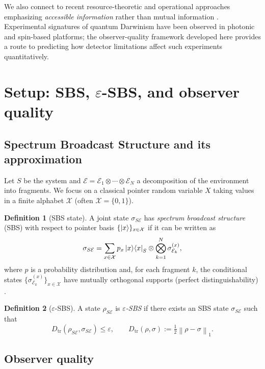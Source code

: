 \documentclass[11pt]{article}
\newcommand{\cE}{\mathcal{E}}
\newcommand{\cX}{\mathcal{X}}
\newcommand{\Dtr}{D_{\mathrm{tr}}}
\newcommand{\normone}[1]{\left\lVert #1\right\rVert_{1}}
\newcommand{\1}{\mathbf{1}}
\theoremstyle{definition}
\newtheorem{definition}{Definition}
\theoremstyle{plain}
\begin{document}
We also connect to recent resource-theoretic and operational approaches emphasizing \emph{accessible information} rather than mutual information \citep{Touil2022}.
Experimental signatures of quantum Darwinism have been observed in photonic \citep{Ciampini2018} and spin-based platforms; the observer-quality framework developed here provides a route to predicting how detector limitations affect such experiments quantitatively.

\section{Setup: SBS, $\varepsilon$-SBS, and observer quality}

\subsection{Spectrum Broadcast Structure and its approximation}

Let $S$ be the system and $\cE=\cE_1\otimes\cdots\otimes\cE_N$ a decomposition of the environment into fragments.
We focus on a classical pointer random variable $X$ taking values in a finite alphabet $\cX$ (often $\cX=\{0,1\}$).

\begin{definition}[SBS state]
A joint state $\sigma_{S\cE}$ has \emph{spectrum broadcast structure} (SBS) with respect to pointer basis $\{\ket{x}\}_{x\in\cX}$ if it can be written as
\begin{equation}
\sigma_{S\cE}=\sum_{x\in\cX} p_x \ket{x}\!\bra{x}_S \otimes \bigotimes_{k=1}^N \sigma^{(x)}_{\cE_k},
\label{eq:sbs}
\end{equation}
where $p$ is a probability distribution and, for each fragment $k$, the conditional states $\{\sigma^{(x)}_{\cE_k}\}_{x\in\cX}$ have mutually orthogonal supports (perfect distinguishability) \citep{HorodeckiKorbiczHorodecki2015,KorbiczReview2021}.
\end{definition}

\begin{definition}[$\varepsilon$-SBS]
A state $\rho_{S\cE}$ is \emph{$\varepsilon$-SBS} if there exists an SBS state $\sigma_{S\cE}$ such that
\[
\Dtr(\rho_{S\cE},\sigma_{S\cE})\le \varepsilon,
\qquad
\Dtr(\rho,\sigma):=\tfrac12\normone{\rho-\sigma}.
\]
\end{definition}

\subsection{Observer quality}
\end{document}
